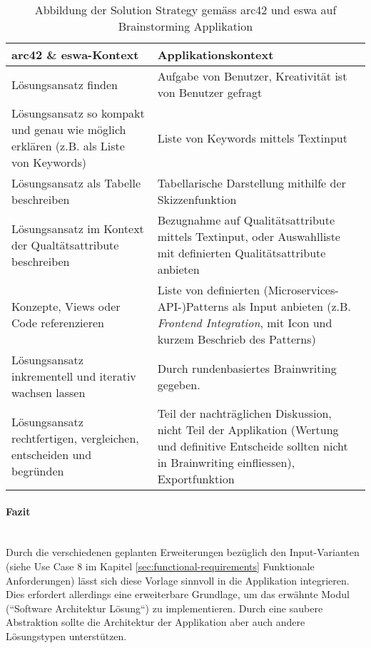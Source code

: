 \renewcommand{\arraystretch}{1.7}
\begin{table}
	\centering
	\begin{tabular}{|p{6cm}|p{6cm}|}
		\hline
		\textbf{arc42 \& eswa\tablefootnote{Buch Effektive Softwarearchitekturen}-Kontext} & \textbf{Applikationskontext}\\
		\hline
		Lösungsansatz finden & Aufgabe von Benutzer, Kreativität ist von Benutzer gefragt\\
		\hline
		Lösungsansatz so kompakt und genau wie möglich erklären (z.B. als Liste von Keywords) & Liste von Keywords mittels Textinput \\
		\hline
		Lösungsansatz als Tabelle beschreiben & Tabellarische Darstellung mithilfe der Skizzenfunktion\\
		\hline
		Lösungsansatz im Kontext der Qualtätsattribute beschreiben & Bezugnahme auf Qualitätsattribute mittels Textinput, oder Auswahlliste mit definierten Qualitätsattribute anbieten\\
		\hline
		Konzepte, Views oder Code referenzieren & Liste von definierten (Microservices-API-)Patterns\cite{microservices-api} als Input anbieten (z.B. \textit{Frontend Integration}, mit Icon und kurzem Beschrieb des Patterns)\\
		\hline
		Lösungsansatz inkrementell und iterativ wachsen lassen & Durch rundenbasiertes Brainwriting gegeben. \\
		\hline
		Lösungsansatz rechtfertigen, vergleichen, entscheiden und begründen & Teil der nachträglichen Diskussion, nicht Teil der Applikation (Wertung und definitive Entscheide sollten nicht in Brainwriting einfliessen), Exportfunktion \\
		\hline
	\end{tabular}
	\caption{Abbildung der Solution Strategy gemäss arc42 und eswa auf Brainstorming Applikation}
	\label{tab:arc42-mapping}
\end{table}
\paragraph{Fazit}~\\
Durch die verschiedenen geplanten Erweiterungen bezüglich den Input-Varianten (siehe Use Case 8 im Kapitel \ref{sec:functional-requirements} Funktionale Anforderungen) lässt sich diese Vorlage sinnvoll in die Applikation integrieren. Dies erfordert allerdings eine erweiterbare Grundlage, um das erwähnte Modul (``Software Architektur Lösung``) zu implementieren. Durch eine saubere Abstraktion sollte die Architektur der Applikation aber auch andere Lösungstypen unterstützen.
\newpage

